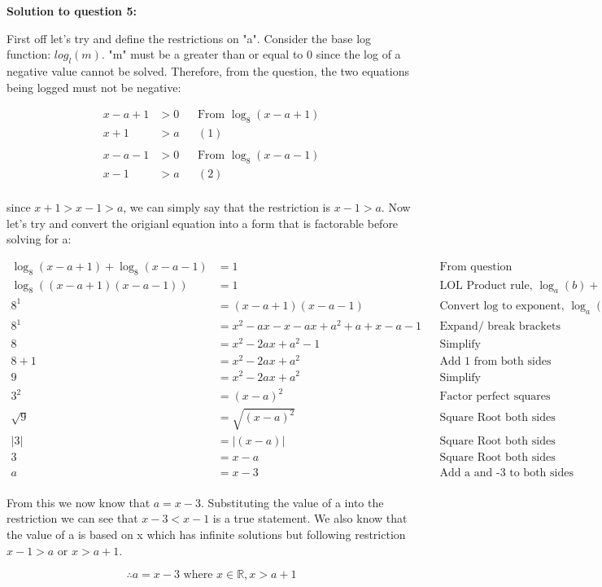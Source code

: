 \documentclass[12pt]{book}
\begin{document}
\begin{enumerate}
\vspace{0.1cm}
\textbf{Solution to question 5:}

First off let's try and define the restrictions on "a". Consider the base 
log function: $log_l(m)$. "m" must be a greater than or equal to 0 since the 
log of a negative value cannot be solved. Therefore, from the question, the two 
equations being logged must not be negative:

\begin{align*}
    x - a + 1 &> 0 && \text{From } \log_8(x-a+1) \\
    x + 1 &> a && (1)\\
\end{align*}
\vspace{-1cm}
\begin{align*}
    x - a - 1 &> 0 && \text{From } \log_8(x-a-1) \\
    x - 1 &> a && (2)\\
\end{align*}

since $x+1 > x-1 > a$, we can simply say that the restriction is $x-1 > a$. 
Now let's try and convert the origianl equation into a form that is factorable 
before solving for a:

\begin{align*}
    \log_8(x-a+1) + \log_8(x-a-1) &= 1 && \text{From question} \\
    \log_8((x-a+1)(x-a-1)) &= 1 && \text{LOL Product rule, } \log_a(b) + \log_a(c) = \log_a(bc) \\
    8^1 &= (x-a+1)(x-a-1) && \text{Convert log to exponent, } \log_a(b) = c \Longleftrightarrow a^c = b \\
    8^1 &= x^2-ax-x-ax+a^2+a+x-a-1 && \text{Expand/ break brackets} \\
    8 &= x^2-2ax+a^2-1 && \text{Simplify} \\
    8+1 &=  x^2-2ax+a^2 && \text{Add 1 from both sides} \\
    9 &=  x^2-2ax+a^2 && \text{Simplify} \\
    3^2 &=  (x-a)^2 && \text{Factor perfect squares} \\
    \sqrt{9} &= \sqrt{(x-a)^2} && \text{Square Root both sides} \\
    |3| &= |(x-a)| && \text{Square Root both sides} \\
    3 &= x-a && \text{Square Root both sides} \\
    a &= x-3 && \text{Add a and -3 to both sides} \\
\end{align*}

From this we now know that $a=x-3$. Substituting the value of a into the 
restriction we can see that $x-3<x-1$ is a true statement. We also know that 
the value of a is based on x which has infinite solutions but following 
restriction $x-1 > a$ or $x > a+1$.

$$\therefore a = x-3 \text{ where } x \in \mathbb{R}, x>a+1 $$


\newpage


\end{enumerate}
\end{document}
